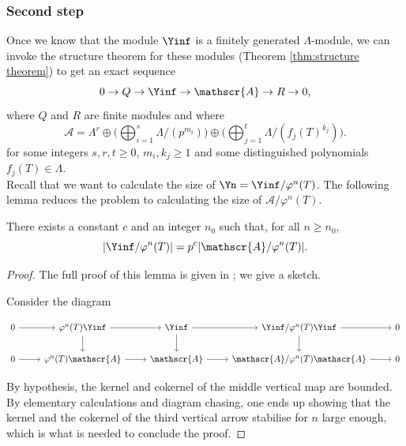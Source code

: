 \documentclass[a4paper,10pt, english, reqno]{smfart}
\numberwithin{equation}{section}
\begin{document}
\subsubsection{Second step}

Once we know that the module $\Yinf$ is a finitely generated $\Lambda$-module, we can invoke the structure theorem for these modules (Theorem \ref{thm:structure theorem}) to get an exact sequence
\[ 0 \to Q \to \Yinf \to \mathscr{A} \to R \to 0, \] where $Q$ and $R$ are finite modules and where
\[ \mathscr{A} = \Lambda^r \oplus \bigg( \bigoplus_{i = 1}^s \Lambda / (p^{m_i}) \bigg) \oplus \bigg( \bigoplus_{j = 1}^t \Lambda / (f_j(T)^{k_j}) \bigg). \]
for some integers $s, r, t \geq 0$, $m_i, k_j \geq 1$ and some distinguished polynomials $f_j(T) \in \Lambda$.\\

Recall that we want to calculate the size of $\Yn = \Yinf / \varphi^n(T)$. The following lemma reduces the problem  to calculating the size of $\mathscr{A} / \varphi^n(T)$.

\begin{lemme} \label{IwLemma0}
There exists a constant $c$ and an integer $n_0$ such that, for all $n \geq n_0$,
\[ | \Yinf / \varphi^n(T) | = p^c | \mathscr{A} / \varphi^n(T) |.\]
\end{lemme}

\begin{proof}
	The full proof of this lemma is given in \cite[Lem.\ 13.21]{Washington}; we give a sketch.
	
Consider the diagram

\[
\begin{tikzcd}
               0 \arrow[r] & \varphi^n(T) \Yinf \arrow[r] \arrow[d] & \Yinf \arrow[r] \arrow[d] & \Yinf / \varphi^n(T) \Yinf \arrow[r] \arrow[d] & 0 \\
               0 \arrow[r] & \varphi^n(T) \mathscr{A} \arrow[r] & \mathscr{A} \arrow[r] & \mathscr{A} / \varphi^n(T) \mathscr{A} \arrow[r] & 0
\end{tikzcd}
\]


By hypothesis, the kernel and cokernel of the middle vertical map are bounded. By elementary calculations and diagram chasing, one ends up showing that the kernel and the cokernel of the third vertical arrow stabilise for $n$ large enough, which is what is needed to conclude the proof.
\end{proof}
\end{document}
